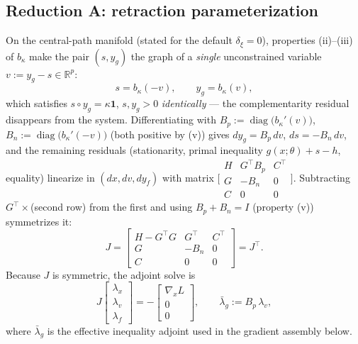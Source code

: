 \documentclass[10pt,twocolumn]{article}
\newcommand{\R}{\mathbb{R}}
\newcommand{\diag}{\operatorname{diag}}
\newcommand{\ones}{\mathbf{1}}
\begin{document}
\subsection{Reduction A: retraction parameterization}
\label{sec:redA}
On the central-path manifold (stated for the default $\delta_\xi = 0$), properties
(ii)--(iii) of $b_\kappa$ make the pair $(s, y_g)$ the graph of a \emph{single}
unconstrained variable $v := y_g - s\in\R^p$:
\begin{equation}
s = b_\kappa(-v), \qquad y_g = b_\kappa(v),
\end{equation}
which satisfies $s\circ y_g = \kappa\ones$, $s,y_g>0$ \emph{identically} --- the
complementarity residual disappears from the system. Differentiating with
$B_p := \diag\bigl(b_\kappa'(v)\bigr)$, $B_n := \diag\bigl(b_\kappa'(-v)\bigr)$
(both positive by (v)) gives $dy_g = B_p\,dv$, $ds = -B_n\,dv$, and the remaining
residuals (stationarity, primal inequality $g(x;\theta) + s - h$, equality)
linearize in $(dx, dv, dy_f)$ with matrix
$\bigl[\begin{smallmatrix} H & G^\top B_p & C^\top\\ G & -B_n & 0\\
C & 0 & 0\end{smallmatrix}\bigr]$.
Subtracting $G^\top\times$(second row) from the first and using
$B_p + B_n = I$ (property (v)) symmetrizes it:
\begin{equation}
\label{eq:J}
J =
\begin{bmatrix}
H - G^\top G & G^\top & C^\top\\
G & -B_n & 0\\
C & 0 & 0
\end{bmatrix} = J^\top .
\end{equation}
Because $J$ is symmetric, the adjoint solve is
\begin{equation}
\label{eq:J-adjoint}
J\begin{bmatrix}\lambda_x\\ \lambda_v\\ \lambda_f\end{bmatrix}
= -\begin{bmatrix}\nabla_x L\\ 0\\ 0\end{bmatrix},
\qquad
\bar\lambda_g := B_p\,\lambda_v ,
\end{equation}
where $\bar\lambda_g$ is the effective inequality adjoint used in the gradient
assembly below.
\end{document}
